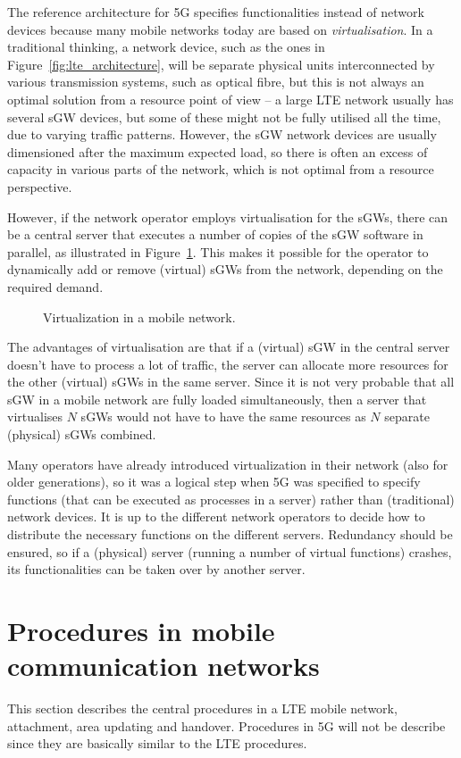 The reference architecture for 5G specifies functionalities instead of network devices because many mobile networks today are based on \emph{virtualisation}. In a traditional thinking, a network device, such as the ones in Figure~\ref{fig:lte_architecture}, will be separate physical units interconnected by various transmission systems, such as optical fibre, but this is not always an optimal solution from a resource point of view -- a large LTE network usually has several sGW devices, but some of these might not be fully utilised all the time, due to varying traffic patterns. However, the sGW network devices are usually dimensioned after the maximum expected load, so there is often an excess of capacity in various parts of the network, which is not optimal from a resource perspective.

However, if the network operator employs virtualisation for the sGWs, there can be a central server that executes a number of copies of the sGW software in parallel, as illustrated in Figure~\ref{fig:virtualization}. This makes it possible for the operator to dynamically add or remove (virtual) sGWs from the network, depending on the required demand.
\begin{figure}[htbp]
\centering
{}
\caption{\label{fig:virtualization}Virtualization in a mobile network.}
\end{figure}

The advantages of virtualisation are that if a (virtual) sGW in the central server doesn't have to process a lot of traffic, the server can allocate more resources for the other (virtual) sGWs in the same server. Since it is not very probable that all sGW in a mobile network are fully loaded simultaneously, then a server that virtualises $N$ sGWs would not have to have the same resources as $N$ separate (physical) sGWs combined.

Many operators have already introduced virtualization in their network (also for older generations), so it was a logical step when 5G was specified to specify functions (that can be executed as processes in a server) rather than (traditional) network devices. It is up to the different network operators to decide how to distribute the necessary functions on the different servers. Redundancy should be ensured, so if a (physical) server (running a number of virtual functions) crashes, its functionalities can be taken over by another server.

\section{Procedures in mobile communication networks}
This section describes the central procedures in a LTE mobile network, \eg attachment, area updating and handover. Procedures in 5G will not be describe since they are basically similar to the LTE procedures.

